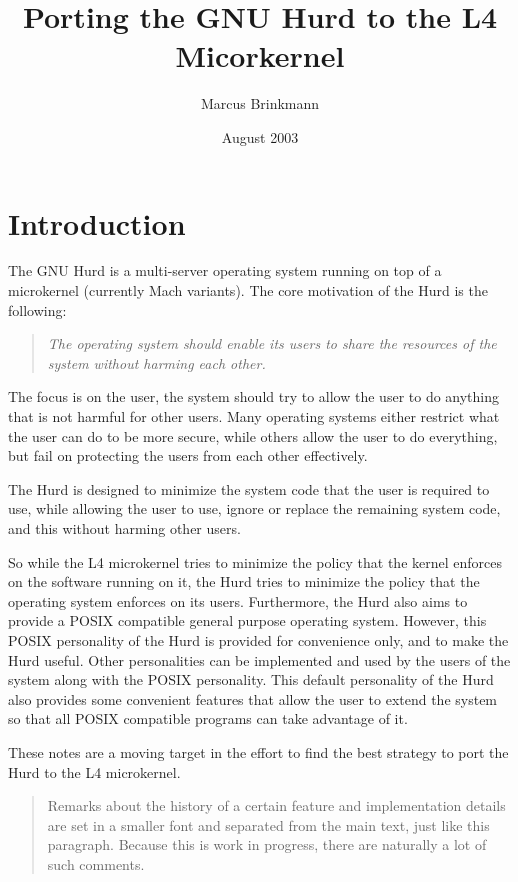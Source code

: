 \documentclass[9pt,a4paper]{extarticle}
\title{Porting the GNU Hurd to the L4 Micorkernel}
\author{Marcus Brinkmann}
\date{August 2003}
\newenvironment{comment}{\footnotesize \begin{quote}}{\end{quote}}
\begin{document}
\maketitle
\newpage
\tableofcontents
\newpage
\setlength{\parindent}{0pt}
\setlength{\parskip}{1ex plus 0.5ex minus 0.2ex}

\section{Introduction}

The GNU Hurd is a multi-server operating system running on top of a
microkernel (currently Mach variants).  The core motivation of the
Hurd is the following:

\begin{quote}
  \emph{The operating system should enable its users to share the
    resources of the system without harming each other.}
\end{quote}

The focus is on the user, the system should try to allow the user to
do anything that is not harmful for other users.  Many operating
systems either restrict what the user can do to be more secure, while
others allow the user to do everything, but fail on protecting the
users from each other effectively.

The Hurd is designed to minimize the system code that the user is
required to use, while allowing the user to use, ignore or replace the
remaining system code, and this without harming other users.

So while the L4 microkernel tries to minimize the policy that the
kernel enforces on the software running on it, the Hurd tries to
minimize the policy that the operating system enforces on its users.
Furthermore, the Hurd also aims to provide a POSIX compatible general
purpose operating system.  However, this POSIX personality of the Hurd
is provided for convenience only, and to make the Hurd useful.  Other
personalities can be implemented and used by the users of the system
along with the POSIX personality.  This default personality of the
Hurd also provides some convenient features that allow the user to
extend the system so that all POSIX compatible programs can take
advantage of it.

These notes are a moving target in the effort to find the best
strategy to port the Hurd to the L4 microkernel.

\begin{comment}
  Remarks about the history of a certain feature and implementation
  details are set in a smaller font and separated from the main text,
  just like this paragraph.  Because this is work in progress, there
  are naturally a lot of such comments.
\end{comment}
\end{document}

